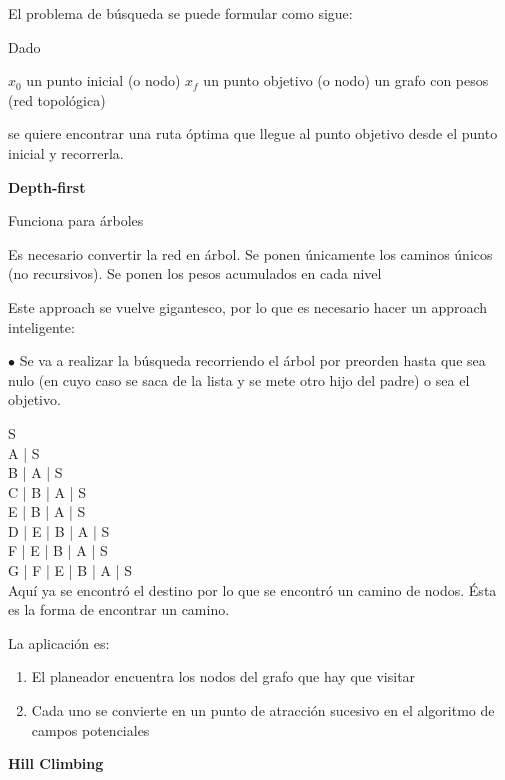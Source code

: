 El problema de búsqueda se puede formular como sigue:
 
\begin{scaja}
	Dado
	
	$x_0$ un punto inicial (o nodo)
	$x_f$ un punto objetivo (o nodo)
	un grafo con pesos (red topológica)
	
	se quiere encontrar una ruta óptima que llegue al punto objetivo desde el punto inicial y recorrerla.

\end{scaja} 

\begin{ejemplo}
	
\end{ejemplo}


\textbf{Depth-first}

Funciona para árboles

Es necesario convertir la red en árbol. Se ponen únicamente los caminos únicos (no recursivos).
Se ponen los pesos acumulados en cada nivel

Este approach se vuelve gigantesco, por lo que es necesario hacer un approach inteligente:

$\bullet$	Se va a realizar la búsqueda recorriendo el árbol por preorden hasta que sea nulo (en cuyo caso se
saca de la lista y se mete otro hijo del padre) o sea el objetivo.

S \\
A | S \\
B | A | S \\
C | B | A | S \\
E | B | A | S \\
D | E | B | A | S \\
F | E | B | A | S \\
G | F | E | B | A | S \\ 

Aquí ya se encontró el destino por lo que se encontró un camino de nodos. Ésta es la forma de encontrar un
camino.

La aplicación es:

\begin{enumerate}[1.]
	\item El planeador encuentra los nodos del grafo que hay que visitar	
	\item Cada uno se convierte en un punto de atracción sucesivo en el algoritmo de campos potenciales	
\end{enumerate}



\textbf{Hill Climbing}

